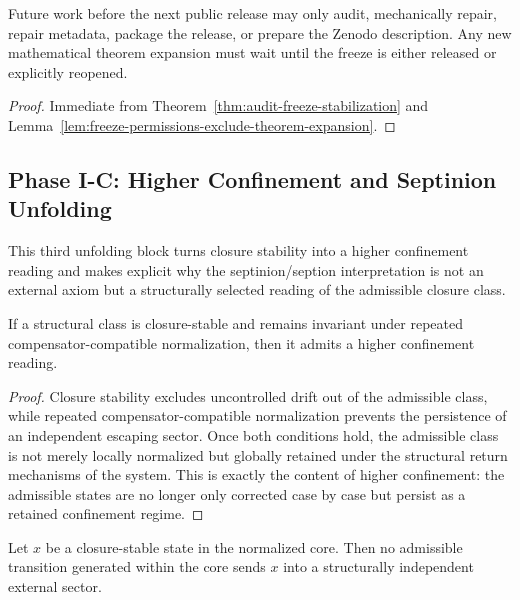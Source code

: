 \begin{corollary}
\label{cor:audit-freeze-working-rule}
Future work before the next public release may only audit, mechanically repair, repair metadata, package the release, or prepare the Zenodo description. Any new mathematical theorem expansion must wait until the freeze is either released or explicitly reopened.
\end{corollary}

\begin{proof}
Immediate from Theorem~\ref{thm:audit-freeze-stabilization} and Lemma~\ref{lem:freeze-permissions-exclude-theorem-expansion}.
\end{proof}



\subsection*{Phase I-C: Higher Confinement and Septinion Unfolding}

This third unfolding block turns closure stability into a higher confinement
reading and makes explicit why the septinion/seption interpretation is not an
external axiom but a structurally selected reading of the admissible closure
class.

\begin{lemma}
\label{lem:higher-confinement-lemma}
If a structural class is closure-stable and remains invariant under repeated
compensator-compatible normalization, then it admits a higher confinement
reading.
\end{lemma}

\begin{proof}
Closure stability excludes uncontrolled drift out of the admissible class, while
repeated compensator-compatible normalization prevents the persistence of an
independent escaping sector. Once both conditions hold, the admissible class is
not merely locally normalized but globally retained under the structural return
mechanisms of the system. This is exactly the content of higher confinement:
the admissible states are no longer only corrected case by case but persist as a
retained confinement regime.
\end{proof}

\begin{lemma}
\label{lem:non-escape-lemma}
Let $x$ be a closure-stable state in the normalized core. Then no admissible
transition generated within the core sends $x$ into a structurally independent
external sector.
\end{lemma}

